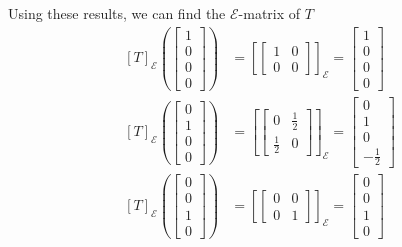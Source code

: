 \documentclass[12pt]{exam}
\begin{document}
\begin{questions}
\begin{parts}
\begin{solution}
\begin{align*}
                    \\
                \end{align*}
                Using these results, we can find the $\mathcal E$-matrix of $T$
                \begin{align*}
                    \left[T\right]_\mathcal E \left(\begin{bmatrix} 1 \\ 0 \\ 0 \\ 0 \end{bmatrix}\right) &= \left[\begin{bmatrix*} 1 & 0 \\ 0 & 0 \end{bmatrix*}\right]_\mathcal E = \begin{bmatrix} 1 \\ 0 \\ 0 \\ 0 \end{bmatrix} 
                    \\
                    \left[T\right]_\mathcal E \left(\begin{bmatrix} 0 \\ 1 \\ 0 \\ 0 \end{bmatrix}\right) &= \left[\begin{bmatrix*} 0 & \frac{1}{2} \\ \frac{1}{2} & 0 \end{bmatrix*}\right]_\mathcal E = \begin{bmatrix} 0 \\ 1 \\ 0 \\ -\frac{1}{2}\end{bmatrix} 
                    \\
                    \left[T\right]_\mathcal E \left(\begin{bmatrix} 0 \\ 0 \\ 1 \\ 0 \end{bmatrix}\right) &= \left[\begin{bmatrix*} 0 & 0 \\ 0 & 1 \end{bmatrix*}\right]_\mathcal E = \begin{bmatrix} 0 \\ 0 \\ 1 \\ 0 \end{bmatrix} 

\end{align*}
\end{solution}
\end{parts}
\end{questions}
\end{document}
